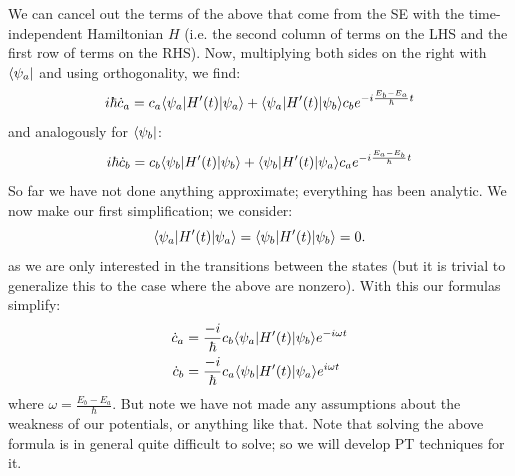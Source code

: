 We can cancel out the terms of the above that come from the SE with the time-independent Hamiltonian $H$ (i.e. the second column of terms on the LHS and the first row of terms on the RHS). Now, multiplying both sides on the right with $\langle \psi_a \rvert$ and using orthogonality, we find:
\begin{equation}
    i\hbar \dot{c}_a = c_a\langle \psi_a \rvert H'(t)\lvert \psi_a \rangle + \langle \psi_a \rvert H'(t)\lvert \psi_b \rangle c_b e^{-i\frac{E_b - E_a}{\hbar}t}
\end{equation}
and analogously for $\langle \psi_b \rvert$:
\begin{equation}
    i\hbar \dot{c}_b = c_b\langle \psi_b \rvert H'(t)\lvert \psi_b \rangle + \langle \psi_b \rvert H'(t)\lvert \psi_a \rangle c_a e^{-i\frac{E_a - E_b}{\hbar}t}
\end{equation}
So far we have not done anything approximate; everything has been analytic. We now make our first simplification; we consider:
\begin{equation}
    \langle \psi_a \rvert H'(t)\lvert \psi_a \rangle = \langle \psi_b \rvert H'(t)\lvert \psi_b \rangle = 0.
\end{equation}
as we are only interested in the transitions between the states (but it is trivial to generalize this to the case where the above are nonzero). With this our formulas simplify:
\begin{equation}
    \begin{split}
        \dot{c}_a &= \frac{-i}{\hbar}c_b \langle \psi_a \rvert H'(t)\lvert \psi_b \rangle e^{-i\omega t}
        \\  \dot{c}_b &= \frac{-i}{\hbar}c_a\langle \psi_b \rvert H'(t)\lvert \psi_a \rangle e^{i\omega t}
    \end{split}
\end{equation}
where $\omega = \frac{E_b - E_a}{\hbar}$. But note we have not made any assumptions about the weakness of our potentials, or anything like that. Note that solving the above formula is in general quite difficult to solve; so we will develop PT techniques for it.
